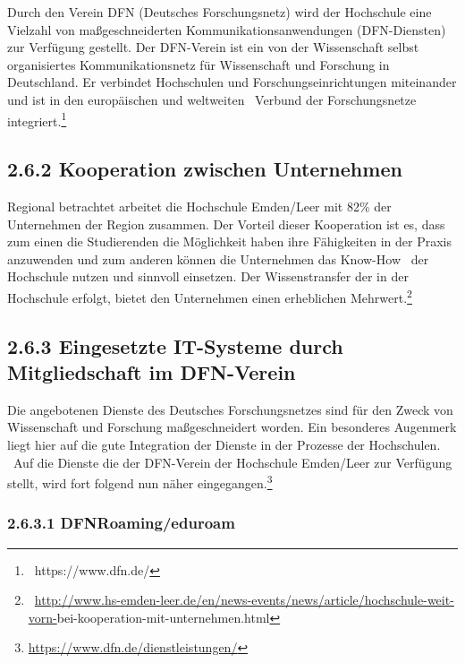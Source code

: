 \documentclass[a4paper]{article}
\newcommand\textstyleHyperlink[1]{\textcolor{blue}{#1}}
\begin{document}
\bigskip

{\sffamily\mdseries\color{black}
Durch den Verein DFN (Deutsches Forschungsnetz) wird der Hochschule eine Vielzahl von maßgeschneiderten
Kommunikationsanwendungen (DFN-Diensten) zur Verfügung gestellt. Der DFN-Verein ist ein von der Wissenschaft selbst
organisiertes Kommunikationsnetz für Wissenschaft und Forschung in Deutschland. Er verbindet Hochschulen und
Forschungseinrichtungen miteinander und ist in den europäischen und weltweiten \ Verbund der Forschungsnetze
integriert.\footnote{\textstyleHyperlink{\textcolor{black}{\ }}https://www.dfn.de/}}

\subsection[2.6.2 Kooperation zwischen Unternehmen]{\bfseries 2.6.2 Kooperation zwischen Unternehmen}
{\sffamily\mdseries\color{black}
Regional betrachtet arbeitet die Hochschule Emden/Leer mit 82\% der Unternehmen der Region zusammen. Der Vorteil dieser
Kooperation ist es, dass zum einen die Studierenden die Möglichkeit haben ihre Fähigkeiten in der Praxis anzuwenden und
zum anderen können die Unternehmen das Know-How \ der Hochschule nutzen und sinnvoll einsetzen. Der Wissenstransfer der
in der Hochschule erfolgt, bietet den Unternehmen einen erheblichen
Mehrwert.\footnote{\ \href{http://www.hs-emden-leer.de/en/news-events/news/article/hochschule-weit-vorn-bei-kooperation-mit-unternehmen.html}{http://www.hs-emden-leer.de/en/news-events/news/article/hochschule-weit-vorn-}\textcolor{black}{bei}{}-kooperation-mit-unternehmen.html}}

\subsection[2.6.3 Eingesetzte IT{}-Systeme durch Mitgliedschaft im DFN{}-Verein]{\bfseries\color{black} 2.6.3
Eingesetzte IT-Systeme durch Mitgliedschaft im DFN-Verein}
{\sffamily\mdseries\color{black}
Die angebotenen Dienste des Deutsches Forschungsnetzes sind für den Zweck von Wissenschaft und Forschung maßgeschneidert
worden. Ein besonderes Augenmerk liegt hier auf die gute Integration der Dienste in der Prozesse der Hochschulen. \ Auf
die Dienste die der DFN-Verein der Hochschule Emden/Leer zur Verfügung stellt, wird fort folgend nun näher
eingegangen.\footnote{\url{https://www.dfn.de/dienstleistungen/}}}

\subsubsection[2.6.3.1 DFNRoaming/eduroam]{\bfseries\color{black} 2.6.3.1 DFNRoaming/eduroam}
\end{document}
